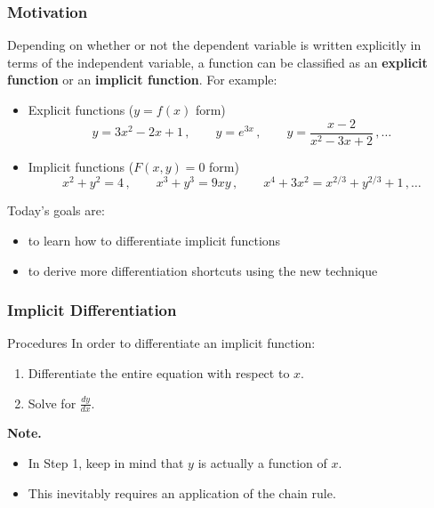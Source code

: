 \documentclass[10pt,t,presentation,ignorenonframetext,aspectratio=169]{beamer}
\title[\course]{\lecTitle}
\institute[Ohio State]
{
  \medskip
}
\date[\week]{\semester}
\author{Tae Eun Kim, Ph.D.}
\begin{document}
\begin{frame}
  \titlepage
\end{frame}

\begin{frame}
  \frametitle{Motivation}
  Depending on whether or not the dependent variable is written explicitly in
  terms of the independent variable, a function can be classified as
  an \textbf{explicit function} or an \textbf{implicit function}. For
  example:
  \begin{itemize}
  \item Explicit functions ($y = f(x)$ form)
    \[
      y = 3x^2 - 2x + 1 \,, \qquad
      y = e^{3x} \,, \qquad
      y = \frac{x-2}{x^2-3x+2} \,,\ldots
    \]
  \item Implicit functions ($F(x,y) = 0$ form)
    \[
      x^2 + y^2 = 4 \,, \qquad
      x^3 + y^3 = 9xy \,, \qquad
      x^4 + 3x^2 = x^{2/3} + y^{2/3} + 1 \,,\ldots
    \]
  \end{itemize}
  \vfill
  Today's goals are:
  \begin{itemize}
  \item to learn how to differentiate implicit functions
  \item to derive more differentiation shortcuts using the new technique
  \end{itemize}
\end{frame}

\begin{frame}
  \frametitle{Implicit Differentiation}
  \begin{block}{Procedures}
    In order to differentiate an implicit function:
    \begin{enumerate}
    \item Differentiate the entire equation with respect to $x$.
    \item Solve for $\frac{dy}{dx}$.
    \end{enumerate}
  \end{block}

  \textbf{Note.}
  \begin{itemize}
  \item In Step 1, keep in mind that $y$ is actually a
    function of $x$.
  \item This inevitably requires an application of the
    chain rule.
  \end{itemize}
\end{frame}
\end{document}
